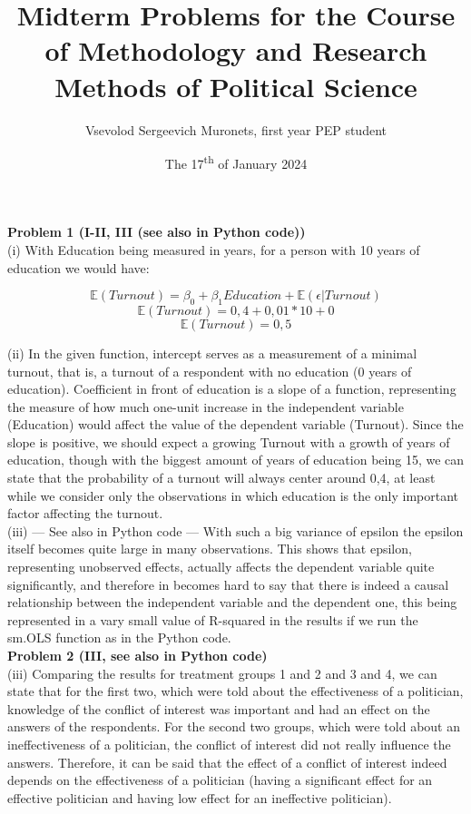 \documentclass{article}
\title{Midterm Problems for the Course of Methodology and Research Methods of Political Science}
\author{Vsevolod Sergeevich Muronets, first year PEP student}
\date{The 17\textsuperscript{th} of January 2024}
\begin{document}
\maketitle
\textbf{Problem 1 (I-II, III (see also in Python code))}
\\

(i) With Education being measured in years, for a person with 10 years of education we would have:

$$\mathbb{E}(Turnout) = \beta_0 + \beta_1Education + \mathbb{E}(\epsilon|Turnout)$$
$$\mathbb{E}(Turnout) = 0,4 + 0,01 * 10 + 0$$
$$\mathbb{E}(Turnout) = 0,5$$

(ii) In the given function, intercept serves as a measurement of a minimal turnout, that is, a turnout of a respondent with no education (0 years of education). Coefficient in front of education is a slope of a function, representing the measure of how much one-unit increase in the independent variable (Education) would affect the value of the dependent variable (Turnout). Since the slope is positive, we should expect a growing Turnout with a growth of years of education, though with the biggest amount of years of education being 15, we can state that the probability of a turnout will always center around 0,4, at least while we consider only the observations in which education is the only important factor affecting the turnout.
\\

(iii) --- See also in Python code --- 
With such a big variance of epsilon the epsilon itself becomes quite large in many observations. This shows that epsilon, representing unobserved effects, actually affects the dependent variable quite significantly, and therefore in becomes hard to say that there is indeed a causal relationship between the independent variable and the dependent one, this being represented in a vary small value of R-squared in the results if we run the sm.OLS function as in the Python code.
\\

\textbf{Problem 2 (III, see also in Python code)}
\\

(iii) Comparing the results for treatment groups 1 and 2 and 3 and 4, we can state that for the first two, which were told about the effectiveness of a politician, knowledge of the conflict of interest was important and had an effect on the answers of the respondents. For the second two groups, which were told about an ineffectiveness of a politician, the conflict of interest did not really influence the answers. Therefore, it can be said that the effect of a conflict of interest indeed depends on the effectiveness of a politician (having a significant effect for an effective politician and having low effect for an ineffective politician).
\\
\end{document}
